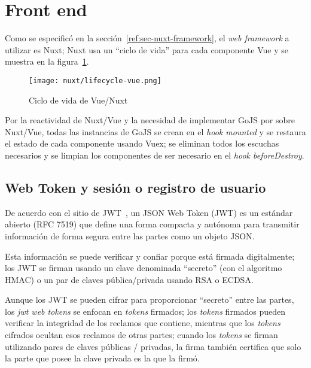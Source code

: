 
\section{Front end}


Como se especificó en la sección~\ref{ref:sec-nuxt-framework}, el \textit{web framework} a utilizar es Nuxt; Nuxt usa un  ``ciclo de vida'' para cada componente Vue y se muestra en la figura~\ref{img:nuxt-lifecycle}.


\begin{figure}[H]
    \centering
    \texttt{[image: nuxt/lifecycle-vue.png]}
    \caption{Ciclo de vida de Vue/Nuxt}
    \label{img:nuxt-lifecycle}
  \end{figure}
  
Por la reactividad de Nuxt/Vue y la necesidad de implementar GoJS por sobre Nuxt/Vue, todas las instancias de GoJS se crean en el \textit{hook mounted} y se restaura el estado de cada componente usando Vuex; se eliminan todos los escuchas necesarios y se limpian los componentes de ser necesario en el \textit{hook beforeDestroy}.

\subsection{Web Token y sesión o registro de usuario} 


De acuerdo con el sitio de JWT~\cite{jwt_web_2020}, un JSON Web Token (JWT) es un estándar abierto (RFC 7519) que define una forma compacta y autónoma para transmitir información de forma segura entre las partes como un objeto JSON.


Esta información se puede verificar y confiar porque está firmada digitalmente; los JWT se firman usando un clave denominada ``secreto'' (con el algoritmo HMAC) o un par de claves pública/privada usando RSA o ECDSA.

Aunque los JWT se pueden cifrar para proporcionar ``secreto'' entre las partes, los \textit{jwt web tokens} se enfocan en \textit{tokens} firmados; los \textit{tokens} firmados pueden verificar la integridad de los reclamos que contiene, mientras que los \textit{tokens} cifrados ocultan esos reclamos de otras partes; cuando los \textit{tokens} se firman utilizando pares de claves públicas / privadas, la firma también certifica que solo la parte que posee la clave privada es la que la firmó.


